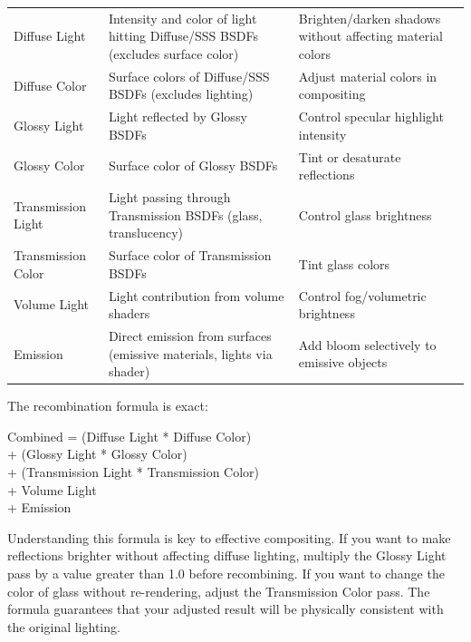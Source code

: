 \vspace{0.5em}
\begin{tabularx}{\textwidth}{l L{4cm} X}
\toprule
{}
 &  &  \\
\midrule
Diffuse Light & Intensity and color of light hitting Diffuse/SSS BSDFs (excludes surface color) & Brighten/darken shadows without affecting material colors \\
Diffuse Color & Surface colors of Diffuse/SSS BSDFs (excludes lighting) & Adjust material colors in compositing \\
Glossy Light & Light reflected by Glossy BSDFs & Control specular highlight intensity \\
Glossy Color & Surface color of Glossy BSDFs & Tint or desaturate reflections \\
Transmission Light & Light passing through Transmission BSDFs (glass, translucency) & Control glass brightness \\
Transmission Color & Surface color of Transmission BSDFs & Tint glass colors \\
Volume Light & Light contribution from volume shaders & Control fog/volumetric brightness \\
Emission & Direct emission from surfaces (emissive materials, lights via shader) & Add bloom selectively to emissive objects \\
\bottomrule
\end{tabularx}
\vspace{0.5em}

The recombination formula is exact:

\begin{codebox}
Combined = (Diffuse Light * Diffuse Color)\\
\hspace*{2em}     + (Glossy Light * Glossy Color)\\
\hspace*{2em}     + (Transmission Light * Transmission Color)\\
\hspace*{2em}     + Volume Light\\
\hspace*{2em}     + Emission
\end{codebox}

\begin{tipbox}
Understanding this formula is key to effective compositing. If you want to make reflections brighter without affecting diffuse lighting, multiply the Glossy Light pass by a value greater than 1.0 before recombining. If you want to change the color of glass without re-rendering, adjust the Transmission Color pass. The formula guarantees that your adjusted result will be physically consistent with the original lighting.
\end{tipbox}

